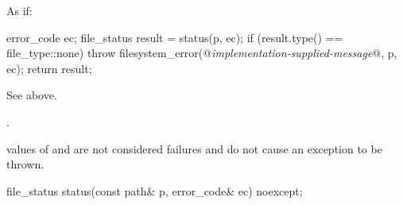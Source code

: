 \begin{itemdescr}
\pnum
\effects As if:
\begin{codeblock}
error_code ec;
file_status result = status(p, ec);
if (result.type() == file_type::none)
  throw filesystem_error(@\textit{implementation-supplied-message}@, p, ec);
return result;
\end{codeblock}

\pnum
\returns See above.

\pnum
\throws {}.
\begin{note}  values of 
  and  are not considered failures and do not
  cause an exception to be thrown.\end{note}
\end{itemdescr}

%
\begin{itemdecl}
file_status status(const path& p, error_code& ec) noexcept;
\end{itemdecl}

